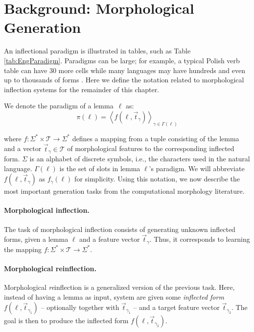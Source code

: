  
\section{Background: Morphological Generation}
\label{sec:tasks}

An inflectional paradigm is illustrated in tables, such as Table \ref{tab:EngParadigm}. Paradigms can be large; for example, a typical Polish verb table can have 30 more cells while many languages may have hundreds and even up to thousands of forms \citep{corbett_unique_2013}. 
Here we define the notation related to morphological inflection systems for the remainder of this chapter.

We denote the paradigm of a lemma~$\ell$ as:
\begin{equation}
    \pi(\ell) = \left\langle f(\ell, \vec{t}_\gamma)\right\rangle_{\gamma \in \Gamma(\ell)}
\end{equation}

\noindent where $f : \Sigma^* \times \mathcal{T} \to \Sigma^*$ defines a mapping from a tuple consisting of the lemma and a vector $\vec{t}_\gamma \in \mathcal{T}$ of morphological features to the corresponding inflected form. $\Sigma$ is an alphabet of discrete symbols, i.e., the characters used in the natural language. $\Gamma(\ell)$ is the set of slots in lemma $\ell$'s paradigm. 
We will abbreviate $f(\ell, \vec{t}_\gamma)$ as $f_{\gamma}(\ell)$ for simplicity. Using this notation, we now describe the most important generation tasks from the computational morphology literature.


\paragraph{Morphological inflection.}
The task of morphological inflection consists of generating unknown inflected forms, given a lemma 
$\ell$ and a feature vector $\vec{t}_\gamma$. Thus, it corresponds to learning the mapping $f : \Sigma^* \times \mathcal{T} \to \Sigma^*$.


\paragraph{Morphological reinflection. }
Morphological \textit{re}inflection is a generalized version of the previous task. Here, instead of having a lemma as input, system are given some \textit{inflected form}  
$f(\ell, \vec{t}_{\gamma_1})$ -- optionally together with $\vec{t}_{\gamma_1}$ -- and a target feature vector $\vec{t}_{\gamma_2}$. The goal is then to produce the inflected form $f(\ell, \vec{t}_{\gamma_2})$.


